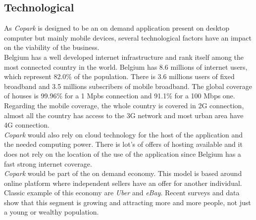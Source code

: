 \documentclass[12pt,a4paper,oneside]{book}
\newcommand{\bp}{\textit{Copark }}
\begin{document}
\subsection{Technological}
As \bp is designed to be an on demand application present on desktop computer but mainly mobile devices, several technological factors have an impact on the viability of the business.\\

Belgium has a well developed internet infrastructure and rank itself among the most connected country in the world. Belgium has 8.6 millions of internet users, which represent 82.0\% of the population.\cite{intuser} There is 3.6 millions users of fixed broadband and 3.5 millions subscribers of mobile broadband.\cite{intsub} The global coverage of houses is 99.96\% for a 1 Mpbs connection and 91.1\% for a 100 Mbps one.\cite{fixcov} Regarding the mobile coverage, the whole country is covered in 2G connection, almost all the country has access to the 3G network and most urban area have 4G connection.\cite{mobcov}\\

\bp would also rely on cloud technology for the host of the application and the needed computing power. There is lot's of offers of hosting available and it does not rely on the location of the use of the application since Belgium has a fast strong internet coverage.\\

\bp would be part of the on demand economy. This model is based around online platform where independent sellers have an offer for another individual. Classic example of this economy are \textit{Uber} and \textit{eBay}. Recent surveys and data show that this segment is growing and attracting more and more people, not just a young or wealthy population.\cite{odegrow}
\end{document}
